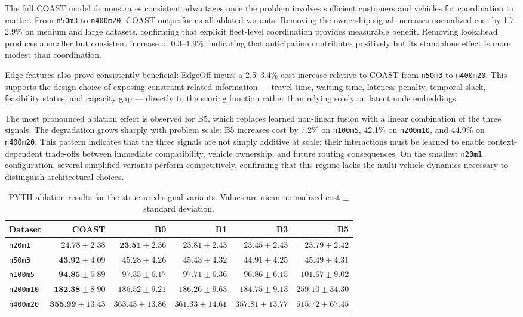 \documentclass[letterpaper]{article}
\begin{document}
The full COAST model demonstrates consistent advantages once the problem involves sufficient customers and vehicles for coordination to matter. From \texttt{n50m3} to \texttt{n400m20}, COAST outperforms all ablated variants. Removing the ownership signal increases normalized cost by 1.7--2.9\% on medium and large datasets, confirming that explicit fleet-level coordination provides measurable benefit. Removing lookahead produces a smaller but consistent increase of 0.3--1.9\%, indicating that anticipation contributes positively but its standalone effect is more modest than coordination.

Edge features also prove consistently beneficial: EdgeOff incurs a 2.5--3.4\% cost increase relative to COAST from \texttt{n50m3} to \texttt{n400m20}. This supports the design choice of exposing constraint-related information --- travel time, waiting time, lateness penalty, temporal slack, feasibility status, and capacity gap --- directly to the scoring function rather than relying solely on latent node embeddings.

The most pronounced ablation effect is observed for B5, which replaces learned non-linear fusion with a linear combination of the three signals. The degradation grows sharply with problem scale: B5 increases cost by 7.2\% on \texttt{n100m5}, 42.1\% on \texttt{n200m10}, and 44.9\% on \texttt{n400m20}. This pattern indicates that the three signals are not simply additive at scale; their interactions must be learned to enable context-dependent trade-offs between immediate compatibility, vehicle ownership, and future routing consequences. On the smallest \texttt{n20m1} configuration, several simplified variants perform competitively, confirming that this regime lacks the multi-vehicle dynamics necessary to distinguish architectural choices.

\begin{table}[t]
\centering
{\small
\setlength{\tabcolsep}{2pt}
\begin{tabular}{lrrrrr}
\toprule
Dataset & COAST & B0 & B1 & B3 & B5 \\
\midrule
\texttt{n20m1} & $24.78\pm2.38$ & $\textbf{23.51}\pm2.36$ & $23.81\pm2.43$ & $23.45\pm2.43$ & $23.79\pm2.42$ \\
\texttt{n50m3} & $\textbf{43.92}\pm4.09$ & $45.28\pm4.26$ & $45.43\pm4.32$ & $44.91\pm4.25$ & $45.49\pm4.31$ \\
\texttt{n100m5} & $\textbf{94.85}\pm5.89$ & $97.35\pm6.17$ & $97.71\pm6.36$ & $96.86\pm6.15$ & $101.67\pm9.02$ \\
\texttt{n200m10} & $\textbf{182.38}\pm8.90$ & $186.52\pm9.21$ & $186.26\pm9.63$ & $184.75\pm9.13$ & $259.10\pm34.30$ \\
\texttt{n400m20} & $\textbf{355.99}\pm13.43$ & $363.43\pm13.86$ & $361.33\pm14.61$ & $357.81\pm13.77$ & $515.72\pm67.45$ \\
\bottomrule
\end{tabular}
}
\caption{PYTH ablation results for the structured-signal variants. Values are mean normalized cost $\pm$ standard deviation.}
\label{tab:ablation_pyth}
\end{table}
\end{document}
